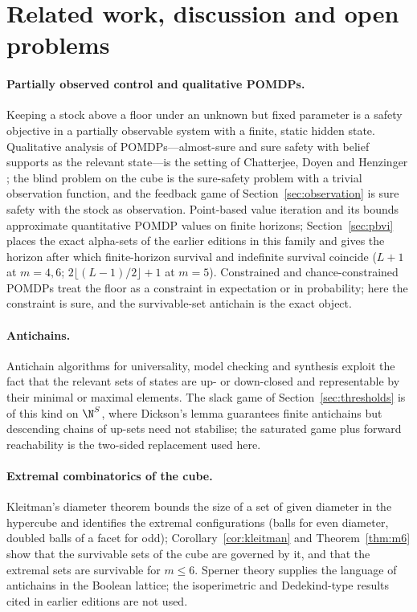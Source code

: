 \section{Related work, discussion and open problems}\label{sec:related}

\paragraph{Partially observed control and qualitative POMDPs.}
Keeping a stock above a floor under an unknown but fixed parameter is a safety objective in a partially observable system with a finite, static hidden state. Qualitative analysis of POMDPs---almost-sure and sure safety with belief supports as the relevant state---is the setting of Chatterjee, Doyen and Henzinger \cite{CDH2010}; the blind problem on the cube is the sure-safety problem with a trivial observation function, and the feedback game of Section~\ref{sec:observation} is sure safety with the stock as observation. Point-based value iteration \cite{Pineau2003,Shani2013} and its bounds \cite{Lovejoy1991} approximate quantitative POMDP values on finite horizons; Section~\ref{sec:pbvi} places the exact alpha-sets of the earlier editions in this family and gives the horizon after which finite-horizon survival and indefinite survival coincide ($L+1$ at $m=4,6$; $2\lfloor(L-1)/2\rfloor+1$ at $m=5$). Constrained and chance-constrained POMDPs \cite{Altman1999,Poupart2015,Santana2016,Undurti2010,Ono2015} treat the floor as a constraint in expectation or in probability; here the constraint is sure, and the survivable-set antichain is the exact object.

\paragraph{Antichains.}
Antichain algorithms for universality, model checking and synthesis \cite{DeWulf2006,DeWulf2008,DoyenRaskin2009,Filiot2009,Filiot2011} exploit the fact that the relevant sets of states are up- or down-closed and representable by their minimal or maximal elements. The slack game of Section~\ref{sec:thresholds} is of this kind on $\N^S$, where Dickson's lemma \cite{Dickson1913} guarantees finite antichains but descending chains of up-sets need not stabilise; the saturated game plus forward reachability is the two-sided replacement used here.

\paragraph{Extremal combinatorics of the cube.}
Kleitman's diameter theorem \cite{Kleitman1966} bounds the size of a set of given diameter in the hypercube and identifies the extremal configurations (balls for even diameter, doubled balls of a facet for odd); Corollary~\ref{cor:kleitman} and Theorem~\ref{thm:m6} show that the survivable sets of the cube are governed by it, and that the extremal sets are survivable for $m\le6$. Sperner theory \cite{Sperner1927,Engel1997} supplies the language of antichains in the Boolean lattice; the isoperimetric and Dedekind-type results cited in earlier editions are not used.

